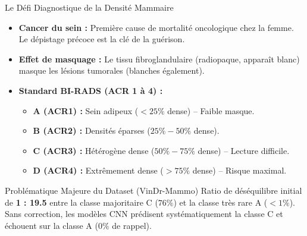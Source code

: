 \documentclass[10pt, compress]{beamer}
\begin{document}
\begin{frame}{Le Défi Diagnostique de la Densité Mammaire}
    \begin{itemize}
        \item \textbf{Cancer du sein :} Première cause de mortalité oncologique chez la femme. Le dépistage précoce est la clé de la guérison.
        \item \textbf{Effet de masquage :} Le tissu fibroglandulaire (radiopaque, apparaît blanc) masque les lésions tumorales (blanches également).
        \item \textbf{Standard BI-RADS (ACR 1 à 4) :}
            \begin{itemize}
                \item \textbf{A (ACR1) :} Sein adipeux ($<25\%$ dense) -- Faible masque.
                \item \textbf{B (ACR2) :} Densités éparses ($25\%-50\%$ dense).
                \item \textbf{C (ACR3) :} Hétérogène dense ($50\%-75\%$ dense) -- Lecture difficile.
                \item \textbf{D (ACR4) :} Extrêmement dense ($>75\%$ dense) -- Risque maximal.
            \end{itemize}
    \end{itemize}
    \begin{alertblock}{Problématique Majeure du Dataset (VinDr-Mammo)}
        Ratio de déséquilibre initial de \textbf{1 : 19.5} entre la classe majoritaire C ($76\%$) et la classe très rare A ($<1\%$). Sans correction, les modèles CNN prédisent systématiquement la classe C et échouent sur la classe A ($0\%$ de rappel).
    \end{alertblock}
\end{frame}
\end{document}
